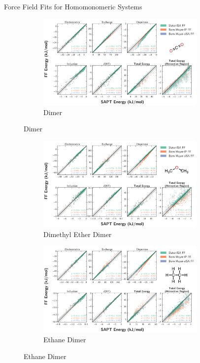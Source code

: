 \begin{section}{Force Field Fits for Homomonomeric Systems}
\begin{figure}
\begin{subfigure}{\textwidth}
    \end{subfigure}
    \begin{subfigure}{\textwidth}
        \caption{\co Dimer}
        \includegraphics[width=0.9\textwidth]{isotropic/si/co2_co2_scatter.pdf}
    \end{subfigure}
    \end{figure}
    \begin{figure}
    \ContinuedFloat
    \begin{subfigure}{\textwidth}
        \caption{Dimethyl Ether Dimer}
        \includegraphics[width=0.9\textwidth]{isotropic/si/dimethyl_ether_dimethyl_ether_scatter.pdf}
    \end{subfigure}
    \begin{subfigure}{\textwidth}
        \caption{Ethane Dimer}
        \includegraphics[width=0.9\textwidth]{isotropic/si/ethane_ethane_scatter.pdf}

\end{subfigure}
\end{figure}
\end{section}
